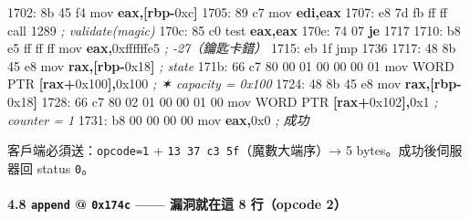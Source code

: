 \documentclass[10pt,a4paper]{article}
\newenvironment{Shaded}{\begin{snugshade}}{\end{snugshade}}
\newcommand{\BaseNTok}[1]{\textcolor[rgb]{0.00,0.00,0.81}{#1}}
\newcommand{\CommentTok}[1]{\textcolor[rgb]{0.56,0.35,0.01}{\textit{#1}}}
\newcommand{\ControlFlowTok}[1]{\textcolor[rgb]{0.13,0.29,0.53}{\textbf{#1}}}
\newcommand{\DataTypeTok}[1]{\textcolor[rgb]{0.13,0.29,0.53}{#1}}
\newcommand{\DecValTok}[1]{\textcolor[rgb]{0.00,0.00,0.81}{#1}}
\newcommand{\FloatTok}[1]{\textcolor[rgb]{0.00,0.00,0.81}{#1}}
\newcommand{\KeywordTok}[1]{\textcolor[rgb]{0.13,0.29,0.53}{\textbf{#1}}}
\newcommand{\NormalTok}[1]{#1}
\newcommand{\OperatorTok}[1]{\textcolor[rgb]{0.81,0.36,0.00}{\textbf{#1}}}
\renewenvironment{Shaded}{%
  \def\FrameCommand{\fboxsep=3.2pt\colorbox{shadecolor}}%
  \MakeFramed{\advance\hsize-\width\FrameRestore\small}%
}{%
  \endMakeFramed
}
\begin{document}
\begin{Shaded}
\begin{Highlighting}[]
\NormalTok{1702: 8b 45 f4               mov    }\KeywordTok{eax}\OperatorTok{,[}\KeywordTok{rbp}\OperatorTok{{-}}\BaseNTok{0xc}\OperatorTok{]}
\NormalTok{1705: 89 c7                  mov    }\KeywordTok{edi}\OperatorTok{,}\KeywordTok{eax}
\NormalTok{1707: e8 }\DecValTok{7}\BaseNTok{d}\NormalTok{ fb ff ff         call   }\DecValTok{1289}                  \CommentTok{; validate(magic)}
\NormalTok{170c: 85 c0                  test   }\KeywordTok{eax}\OperatorTok{,}\KeywordTok{eax}
\NormalTok{170e: 74 07                  }\ControlFlowTok{je}     \DecValTok{1717}
\NormalTok{1710: b8 e5 ff ff ff         mov    }\KeywordTok{eax}\OperatorTok{,}\BaseNTok{0xffffffe5}        \CommentTok{; {-}27（鑰匙卡錯）}
\NormalTok{1715: eb }\FloatTok{1}\BaseNTok{f}\NormalTok{                  jmp    }\DecValTok{1736}
\NormalTok{1717: 48 8b 45 e8            mov    }\KeywordTok{rax}\OperatorTok{,[}\KeywordTok{rbp}\OperatorTok{{-}}\BaseNTok{0x18}\OperatorTok{]}        \CommentTok{; state}
\NormalTok{171b: 66 c7 }\DecValTok{80} \DecValTok{00} \DecValTok{01} \DecValTok{00} \DecValTok{00} \DecValTok{00} \DecValTok{01}\NormalTok{   mov }\DataTypeTok{WORD} \DataTypeTok{PTR} \OperatorTok{[}\KeywordTok{rax}\OperatorTok{+}\BaseNTok{0x100}\OperatorTok{],}\BaseNTok{0x100}  \CommentTok{; ✶ capacity = 0x100}
\NormalTok{1724: 48 8b 45 e8            mov    }\KeywordTok{rax}\OperatorTok{,[}\KeywordTok{rbp}\OperatorTok{{-}}\BaseNTok{0x18}\OperatorTok{]}
\NormalTok{1728: 66 c7 }\DecValTok{80} \DecValTok{02} \DecValTok{01} \DecValTok{00} \DecValTok{00} \DecValTok{01} \DecValTok{00}\NormalTok{   mov }\DataTypeTok{WORD} \DataTypeTok{PTR} \OperatorTok{[}\KeywordTok{rax}\OperatorTok{+}\BaseNTok{0x102}\OperatorTok{],}\BaseNTok{0x1}    \CommentTok{; counter = 1}
\NormalTok{1731: b8 }\DecValTok{00} \DecValTok{00} \DecValTok{00} \DecValTok{00}\NormalTok{         mov    }\KeywordTok{eax}\OperatorTok{,}\BaseNTok{0x0}               \CommentTok{; 成功}
\end{Highlighting}
\end{Shaded}

客戶端必須送：\texttt{opcode=1} + \texttt{13\ \allowbreak{}37\ \allowbreak{}c3\ \allowbreak{}5f}（魔數大端序）→
5 bytes。成功後伺服器回 status \texttt{0}。

\paragraph{\texorpdfstring{4.8 \texttt{append} @ \texttt{0x174c} ------
\textbf{漏洞就在這 8 行}（opcode
2）}{4.8 append @ 0x174c ------ 漏洞就在這 8 行（opcode 2）}}\label{append-0x174c-ux6f0fux6d1eux5c31ux5728ux9019-8-ux884copcode-2}
\end{document}

